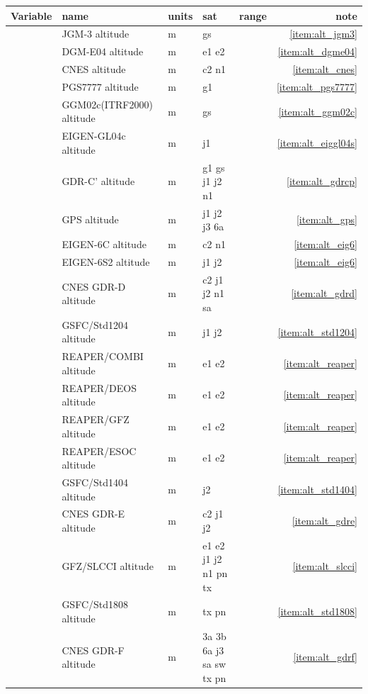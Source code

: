 \documentclass[a4paper,11pt,openany,natbib,nomargin]{thesis}
\newenvironment{vartable}{
\begin{table}[ht]
\small
\begin{tabular}{lllllr}
\hline\hline
Variable & name & units & sat & range & note \\
\hline\hline
}{
\hline
\end{tabular}
\end{table}
}
\begin{document}
\begin{vartable}
\var{alt_jgm3}     & JGM-3 altitude   & m & gs && \ref{item:alt_jgm3} \\
\var{alt_dgme04}   & DGM-E04 altitude & m & e1 e2 && \ref{item:alt_dgme04} \\
\var{alt_cnes}     & CNES altitude    & m & c2 n1 && \ref{item:alt_cnes} \\
\var{alt_pgs7777}  & PGS7777 altitude  & m & g1 && \ref{item:alt_pgs7777} \\
\var{alt_ggm02c_itrf2000} & GGM02c(ITRF2000) altitude  & m & gs && \ref{item:alt_ggm02c} \\
\var{alt_eiggl04s} & EIGEN-GL04c altitude & m & j1 && \ref{item:alt_eiggl04s} \\
\var{alt_gdrcp}    & GDR-C' altitude & m & g1 gs j1 j2 n1 && \ref{item:alt_gdrcp} \\
\var{alt_gps}      & GPS altitude & m & j1 j2 j3 6a && \ref{item:alt_gps} \\
\var{alt_eig6c}    & EIGEN-6C altitude & m & c2 n1 && \ref{item:alt_eig6} \\
\var{alt_eig6s2}   & EIGEN-6S2 altitude & m & j1 j2 && \ref{item:alt_eig6} \\
\var{alt_gdrd}     & CNES GDR-D altitude & m & c2 j1 j2 n1 sa && \ref{item:alt_gdrd} \\
\var{alt_std1204}  & GSFC/Std1204 altitude & m & j1 j2 && \ref{item:alt_std1204} \\
\var{alt_reaper}   & REAPER/COMBI altitude & m & e1 e2 && \ref{item:alt_reaper} \\
\var{alt_reaper_deos} & REAPER/DEOS altitude & m & e1 e2 && \ref{item:alt_reaper} \\
\var{alt_reaper_gfz}  & REAPER/GFZ altitude & m & e1 e2 && \ref{item:alt_reaper} \\
\var{alt_reaper_esoc} & REAPER/ESOC altitude & m & e1 e2 && \ref{item:alt_reaper} \\
\var{alt_std1404}  & GSFC/Std1404 altitude & m & j2 && \ref{item:alt_std1404} \\
\var{alt_gdre}     & CNES GDR-E altitude & m & c2 j1 j2 && \ref{item:alt_gdre} \\
\var{alt_slcci}    & GFZ/SLCCI altitude & m & e1 e2 j1 j2 n1 pn tx && \ref{item:alt_slcci} \\
\var{alt_std1808}  & GSFC/Std1808 altitude & m & tx pn && \ref{item:alt_std1808} \\
\var{alt_gdrf}     & CNES GDR-F altitude & m & 3a 3b 6a j3 sa sw tx pn && \ref{item:alt_gdrf} \\

\end{vartable}
\end{document}
